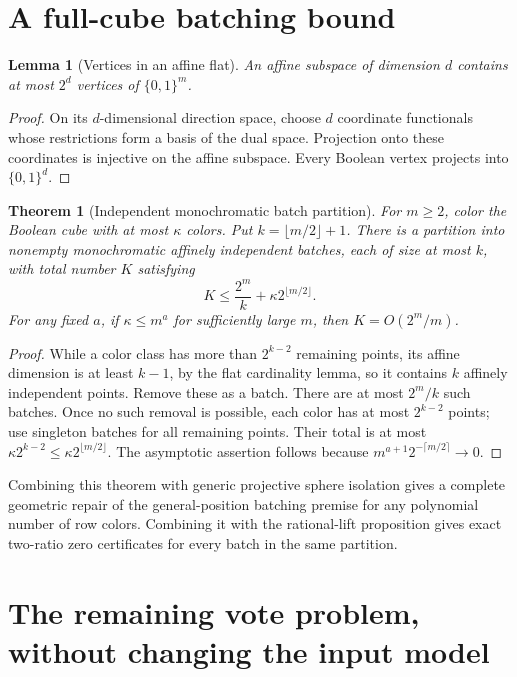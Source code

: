 \documentclass[11pt]{article}
\newtheorem{theorem}{Theorem}
\newtheorem{lemma}{Lemma}
\begin{document}
\section{A full-cube batching bound}

\begin{lemma}[Vertices in an affine flat]
An affine subspace of dimension $d$ contains at most $2^d$ vertices
of $\{0,1\}^m$.
\end{lemma}
\begin{proof}
On its $d$-dimensional direction space, choose $d$ coordinate
functionals whose restrictions form a basis of the dual space.
Projection onto these coordinates is injective on the affine
subspace. Every Boolean vertex projects into $\{0,1\}^d$.
\end{proof}

\begin{theorem}[Independent monochromatic batch partition]
For $m\ge2$, color the Boolean cube with at most $\kappa$ colors.
Put $k=\lfloor m/2\rfloor+1$. There is a partition into nonempty
monochromatic affinely independent batches, each of size at most
$k$, with total number $K$ satisfying
\[
 K\le\frac{2^m}{k}+\kappa 2^{\lfloor m/2\rfloor}.
\]
For any fixed $a$, if $\kappa\le m^a$ for sufficiently large $m$,
then $K=O(2^m/m)$.
\end{theorem}
\begin{proof}
While a color class has more than $2^{k-2}$ remaining points, its
affine dimension is at least $k-1$, by the flat cardinality lemma,
so it contains $k$ affinely independent points. Remove these as a
batch. There are at most $2^m/k$ such batches. Once no such removal
is possible, each color has at most $2^{k-2}$ points; use singleton
batches for all remaining points. Their total is at most
$\kappa2^{k-2}\le\kappa2^{\lfloor m/2\rfloor}$.
The asymptotic assertion follows because
$m^{a+1}2^{-\lceil m/2\rceil}\to0$.
\end{proof}

Combining this theorem with generic projective sphere isolation
gives a complete geometric repair of the general-position batching
premise for any polynomial number of row colors. Combining it with
the rational-lift proposition gives exact two-ratio zero
certificates for every batch in the same partition.

\section{The remaining vote problem, without changing the input model}
\end{document}
